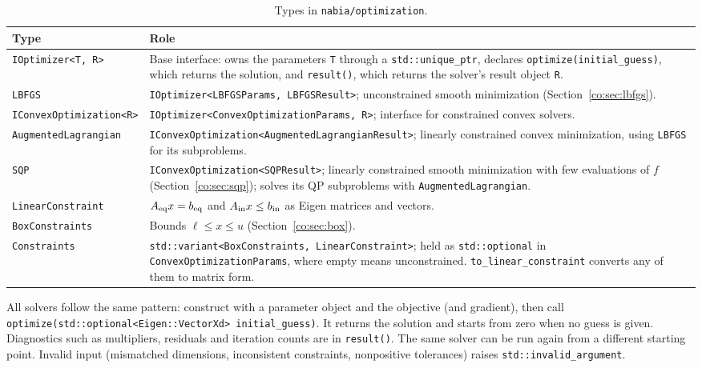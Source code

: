 \begin{table}[ht]
\centering
\begin{tabular}{@{}l>{\raggedright\arraybackslash}p{9.5cm}@{}}
\toprule
Type & Role \\
\midrule
\texttt{IOptimizer<T, R>} & Base interface: owns the parameters \texttt{T} through a \texttt{std::unique\_ptr}, declares \texttt{optimize(initial\_guess)}, which returns the solution, and \texttt{result()}, which returns the solver's result object \texttt{R}. \\
\texttt{LBFGS} & \texttt{IOptimizer<LBFGSParams, LBFGSResult>}; unconstrained smooth minimization (Section~\ref{co:sec:lbfgs}). \\
\texttt{IConvexOptimization<R>} & \texttt{IOptimizer<ConvexOptimizationParams, R>}; interface for constrained convex solvers. \\
\texttt{AugmentedLagrangian} & \texttt{IConvexOptimization<AugmentedLagrangianResult>}; linearly constrained convex minimization, using \texttt{LBFGS} for its subproblems. \\
\texttt{SQP} & \texttt{IConvexOptimization<SQPResult>}; linearly constrained smooth minimization with few evaluations of $f$ (Section~\ref{co:sec:sqp}); solves its QP subproblems with \texttt{AugmentedLagrangian}. \\
\texttt{LinearConstraint} & $A_{\mathrm{eq}} x=b_{\mathrm{eq}}$ and $A_{\mathrm{in}} x\le b_{\mathrm{in}}$ as Eigen matrices and vectors. \\
\texttt{BoxConstraints} & Bounds $\ell\le x\le u$ (Section~\ref{co:sec:box}). \\
\texttt{Constraints} & \texttt{std::variant<BoxConstraints, LinearConstraint>}; held as \texttt{std::optional} in \texttt{ConvexOptimizationParams}, where empty means unconstrained. \texttt{to\_linear\_constraint} converts any of them to matrix form. \\
\bottomrule
\end{tabular}
\caption{Types in \texttt{nabia/optimization}.}
\end{table}

All solvers follow the same pattern: construct with a parameter object and the
objective (and gradient), then call
\texttt{optimize(std::optional<Eigen::VectorXd> initial\_guess)}. It returns
the solution and starts from zero when no guess is given. Diagnostics such as
multipliers, residuals and iteration counts are in \texttt{result()}. The same
solver can be run again from a different starting point. Invalid input (mismatched dimensions, inconsistent
constraints, nonpositive tolerances) raises \texttt{std::invalid\_argument}.

